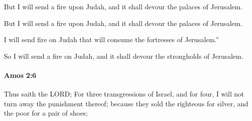 			But I will send a fire upon Judah, and it shall devour the palaces of Jerusalem.

			\begin{versebox}
					\item[BHS] 
					\item[LXX] 
					\item[ASV] But I will send a fire upon Judah, and it shall devour the palaces of Jerusalem.
					\item[NIV] I will send fire on Judah that will consume the fortresses of Jerusalem.”
					\item[NRSV] So I will send a fire on Judah, and it shall devour the strongholds of Jerusalem.
			\end{versebox}

		\paragraph{Amos 2:6} %
			\label{AMOS-2-6}

			Thus saith the LORD; For three transgressions of Israel, and for four, I will not turn away the punishment thereof; because they sold the righteous for silver, and the poor for a pair of shoes;

